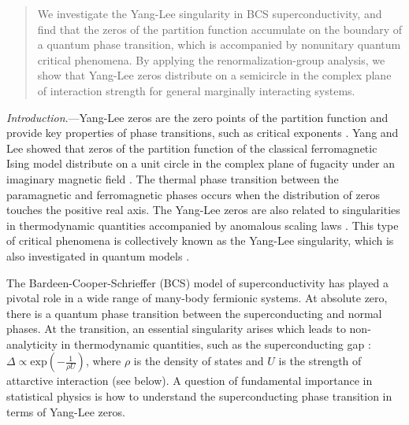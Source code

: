 \documentclass[aps,prl,twocolumn,nofootinbib,superscriptaddress,longbibliography]{revtex4-1}
\begin{document}
\date{\today}
\begin{abstract}
	We investigate the Yang-Lee singularity in BCS superconductivity, and find that the zeros of the partition function accumulate on the boundary of a quantum phase transition, which is accompanied by nonunitary quantum critical phenomena. By applying the renormalization-group analysis, we show that Yang-Lee zeros distribute on a semicircle in the complex plane of interaction strength for general marginally interacting systems. %
	\end{abstract}
	\maketitle
	\emph{Introduction}.---Yang-Lee zeros \cite{PhysRev.87.404,PhysRev.87.410} are the zero points of the partition function and provide key properties of phase transitions, such as critical exponents	\cite{Fisher1965,Fisher:1978vn}. Yang and Lee showed \cite{PhysRev.87.404,PhysRev.87.410} that zeros of the partition function of the classical ferromagnetic Ising model distribute on a unit circle in the complex
	plane of fugacity under an imaginary magnetic field \cite{Simon:1973tr,Newman:1974wi,Lieb:1981vb,Kortman:1971tw}.
	The thermal phase transition between the paramagnetic and ferromagnetic
	phases occurs when the distribution of zeros touches the positive real axis. The Yang-Lee zeros are also related to singularities in thermodynamic quantities accompanied by anomalous scaling laws \cite{Fisher:1978vn,Kurtze:1979wb,10.1143/PTP.69.14,Cardy:1985ub,Cardy:1989uo,Zamolodchikov:1991tl}.
	This type of critical phenomena is collectively known as the Yang-Lee singularity, which is also investigated
	in quantum models \cite{Gehlen_1991,Sumaryada:2007uu,PhysRevB.53.7704,Matsumoto2020,PhysRevResearch.3.033206,PhysRevB.106.054402,PhysRevE.96.032116}.
	
	The Bardeen-Cooper-Schrieffer (BCS) model of superconductivity \cite{Bardeen:1957tx} has played a pivotal role in a wide range of many-body fermionic systems. %
	At absolute zero, there is a quantum phase transition between the superconducting and normal phases. At the transition, an essential singularity arises which leads to non-analyticity in thermodynamic quantities, such as the superconducting gap \cite{Bardeen:1957tx}: $\Delta\propto\text{exp}(-\frac{1}{\rho U})$, where $\rho$ is the density of states and $U$ is the strength of attarctive interaction (see below). A question of fundamental importance in statistical physics is how to understand the superconducting phase transition in terms of Yang-Lee zeros.
	
\end{document}
